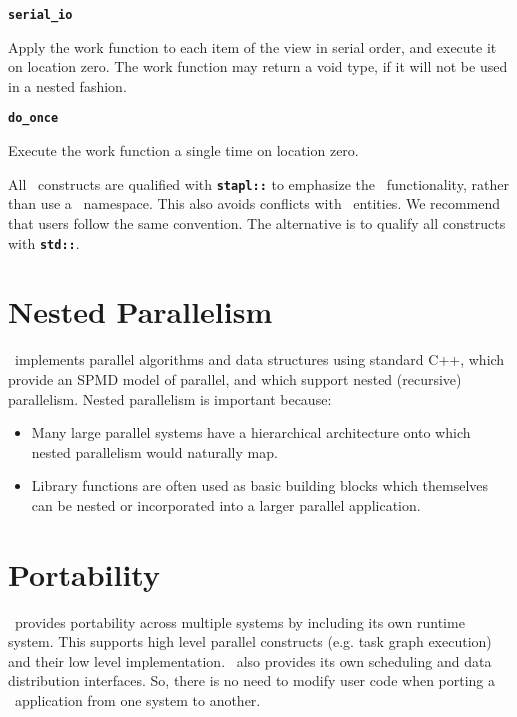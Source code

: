 \documentclass{report}
\begin{document}
\texttt{{\bf serial\_io }}

Apply the work function to each item of the view in serial order,
and execute it on location zero.
The work function may return a void type, if it will not be used
in a nested fashion.

\texttt{{\bf do\_once }}

Execute the work function a single time on location zero.

All \stapl\ constructs are qualified with
\texttt{{\bf stapl::}}
to emphasize the \stapl\ functionality, rather than use a
\stapl\ namespace.
This also avoids conflicts with \stl\ entities.  We recommend that users
follow the same convention.  The alternative is to qualify all
constructs with
\texttt{{\bf std::}}.

\section{Nested Parallelism}

\stapl\ implements parallel algorithms and data structures using standard C++,
which provide an SPMD model of parallel, and which support nested (recursive)
parallelism.  Nested parallelism is important because:

\begin{itemize}
\item
Many large parallel systems have a hierarchical architecture onto which
nested parallelism would naturally map.
\item
Library functions are often used as basic building blocks which themselves
can be nested or incorporated into a larger parallel application.
\end{itemize}

\section{Portability}

\stapl\ provides portability across multiple systems by including its own
runtime system.  This supports high level parallel constructs (e.g. task
graph execution) and their low level implementation.  \stapl\ also provides
its own scheduling and data distribution interfaces.  So, there is no need
to modify user code when porting a \stapl\ application from one system to
another.













\end{document}
